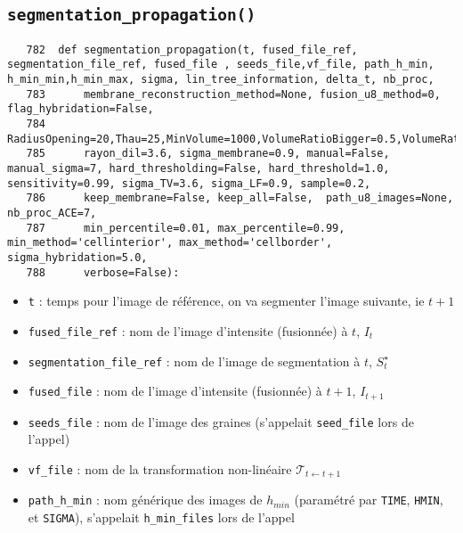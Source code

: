 \documentclass{article}
\def \mycolor {red}
\begin{document}
\subsection{\texttt{segmentation\_propagation()}}
\label{sec:segmentation:propagation}
\begin{verbatim}
   782	def segmentation_propagation(t, fused_file_ref, segmentation_file_ref, fused_file , seeds_file,vf_file, path_h_min, h_min_min,h_min_max, sigma, lin_tree_information, delta_t, nb_proc,
   783	    membrane_reconstruction_method=None, fusion_u8_method=0, flag_hybridation=False, 
   784	    RadiusOpening=20,Thau=25,MinVolume=1000,VolumeRatioBigger=0.5,VolumeRatioSmaller=0.1,MorphosnakeIterations=10,NIterations=200,DeltaVoxels=10**3,Volum_Min_No_Seed=100, 
   785	    rayon_dil=3.6, sigma_membrane=0.9, manual=False, manual_sigma=7, hard_thresholding=False, hard_threshold=1.0, sensitivity=0.99, sigma_TV=3.6, sigma_LF=0.9, sample=0.2, 
   786	    keep_membrane=False, keep_all=False,  path_u8_images=None, nb_proc_ACE=7, 
   787	    min_percentile=0.01, max_percentile=0.99, min_method='cellinterior', max_method='cellborder', sigma_hybridation=5.0, 
   788	    verbose=False):
\end{verbatim} 
\color{\mycolor}
\begin{itemize}
\itemsep -0.5ex
\item \verb|t| : temps pour l'image de r\'ef\'erence, on va segmenter l'image suivante, ie $t+1$
\item \verb|fused_file_ref| : nom de l'image d'intensite (fusionn\'ee) \`a $t$, $I_t$
\item \verb|segmentation_file_ref| : nom de l'image de segmentation \`a $t$, $S^{\star}_t$
\item \verb|fused_file| : nom de l'image d'intensite (fusionn\'ee) \`a $t+1$, $I_{t+1}$
\item \verb|seeds_file| : nom de l'image des graines (s'appelait \verb|seed_file|  lors de l'appel)
\item \verb|vf_file| : nom de la  transformation non-lin\'eaire $\mathcal{T}_{t \leftarrow t+1}$
\item \verb|path_h_min| : nom g\'en\'erique des images de $h_{min}$ (param\'etr\'e par \verb|TIME|, \verb|HMIN|, et \verb|SIGMA|), s'appelait \verb|h_min_files| lors de l'appel
\end{itemize}
\color{black}
\end{document}

